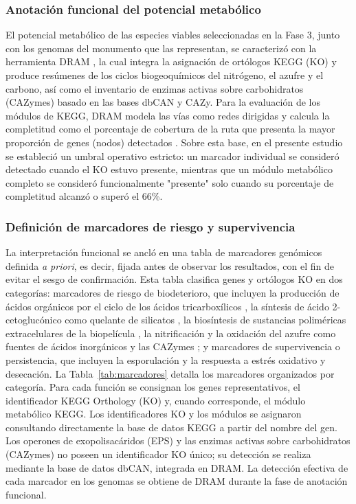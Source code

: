 \subsubsection{Anotación funcional del potencial metabólico}


El potencial metabólico de las especies viables seleccionadas en la Fase 3, junto con los genomas del monumento que las representan, se caracterizó con la herramienta DRAM \cite{dram2020}, la cual integra la asignación de ortólogos KEGG (KO) y produce resúmenes de los ciclos biogeoquímicos del nitrógeno, el azufre y el carbono, así como el inventario de enzimas activas sobre carbohidratos (CAZymes) basado en las bases dbCAN y CAZy. Para la evaluación de los módulos de KEGG, DRAM modela las vías como redes dirigidas y calcula la completitud como el porcentaje de cobertura de la ruta que presenta la mayor proporción de genes (nodos) detectados \cite{dram2020}. Sobre esta base, en el presente estudio se estableció un umbral operativo estricto: un marcador individual se consideró detectado cuando el KO estuvo presente, mientras que un módulo metabólico completo se consideró funcionalmente "presente" solo cuando su porcentaje de completitud alcanzó o superó el 66\%.

\subsubsection{Definición de marcadores de riesgo y supervivencia}

La interpretación funcional se ancló en una tabla de marcadores genómicos definida \textit{a priori}, es decir, fijada antes de observar los resultados, con el fin de evitar el sesgo de confirmación. Esta tabla clasifica genes y ortólogos KO en dos categorías: marcadores de riesgo de biodeterioro, que incluyen la producción de ácidos orgánicos por el ciclo de los ácidos tricarboxílicos \cite{zanardini2019}, la síntesis de ácido 2-cetoglucónico como quelante de silicatos \cite{gutarowska2015}, la biosíntesis de sustancias poliméricas extracelulares de la biopelícula \cite{flemming2010}, la nitrificación y la oxidación del azufre como fuentes de ácidos inorgánicos \cite{dakal2012, zanardini2019} y las CAZymes \cite{cantarel2009,zhang2018}; y marcadores de supervivencia o persistencia, que incluyen la esporulación \cite{Galperin2022} y la respuesta a estrés oxidativo y desecación. La Tabla~\ref{tab:marcadores} detalla los marcadores organizados por categoría. Para cada función se consignan los genes representativos, el identificador KEGG Orthology (KO) y, cuando corresponde, el módulo metabólico KEGG. Los identificadores KO y los módulos se asignaron consultando directamente la base de datos KEGG \cite{kegg2023} a partir del nombre del gen. Los operones de exopolisacáridos (EPS) y las enzimas activas sobre carbohidratos (CAZymes) no poseen un identificador KO único; su detección se realiza mediante la base de datos dbCAN, integrada en DRAM. La detección efectiva de cada marcador en los genomas se obtiene de DRAM durante la fase de anotación funcional.

